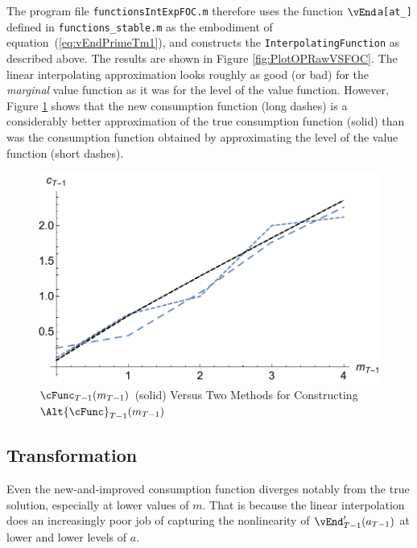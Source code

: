 \documentclass[titlepage, headings=optiontotocandhead]{\econtex}
\begin{document}
The program file \texttt{functionsIntExpFOC.m} therefore
uses the function \texttt{$\vEnd$a[at\_]} defined in \texttt{functions\_stable.m}
as the embodiment of equation~(\ref{eq:vEndPrimeTm1}), and constructs the
\texttt{InterpolatingFunction} as described above.  The results are
shown in Figure \ref{fig:PlotOPRawVSFOC}.  The linear
interpolating approximation looks roughly as good (or bad) for the
\textit{marginal} value function as it was for the level of the value
function. However, Figure \ref{fig:PlotcTm1ABC} shows that the new
consumption function (long dashes) is a considerably better
approximation of the true consumption function (solid) than was the
consumption function obtained by approximating the level of the
value function (short dashes).

\hypertarget{PlotcTm1ABC}{}
\begin{figure}
  \includegraphics{./Figures/PlotcTm1ABC}
  \caption{$\cFunc_{T-1}({m}_{T-1})$ (solid) Versus Two Methods for Constructing $\Alt{\cFunc}_{T-1}({m}_{T-1})$}
  \label{fig:PlotcTm1ABC}
\end{figure}

\hypertarget{Transformation}{}
\subsection{Transformation}

Even the new-and-improved consumption function diverges notably from the true
solution, especially at lower values of ${m}$.  That is because the
linear interpolation does an increasingly poor job of capturing the
nonlinearity of $\vEnd_{T-1}^{\prime}({a}_{T-1})$ at
lower and lower levels of ${a}$.
\end{document}
